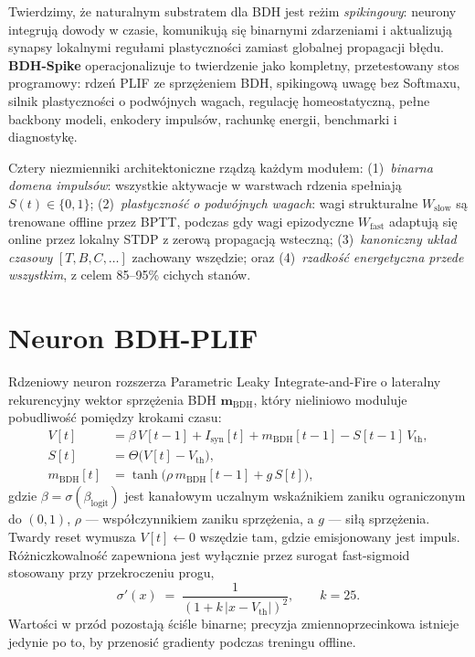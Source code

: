 \documentclass[11pt]{article}
\newcommand{\Wslow}{W_{\text{slow}}}
\newcommand{\Wfast}{W_{\text{fast}}}
\begin{document}
Twierdzimy, że naturalnym substratem dla BDH jest reżim \emph{spikingowy}:
neurony integrują dowody w czasie, komunikują się binarnymi zdarzeniami i
aktualizują synapsy lokalnymi regułami plastyczności zamiast globalnej
propagacji błędu. \textbf{BDH-Spike} operacjonalizuje to twierdzenie jako
kompletny, przetestowany stos programowy: rdzeń PLIF ze sprzężeniem BDH,
spikingową uwagę bez Softmaxu, silnik plastyczności o podwójnych wagach,
regulację homeostatyczną, pełne backbony modeli, enkodery impulsów,
rachunkę energii, benchmarki i diagnostykę.

Cztery niezmienniki architektoniczne rządzą każdym modułem: (1)~\emph{binarna
domena impulsów}: wszystkie aktywacje w warstwach rdzenia spełniają
$S(t)\in\{0,1\}$; (2)~\emph{plastyczność o podwójnych wagach}: wagi
strukturalne $\Wslow$ są trenowane offline przez BPTT, podczas gdy wagi
epizodyczne $\Wfast$ adaptują się online przez lokalny STDP z zerową
propagacją wsteczną; (3)~\emph{kanoniczny układ czasowy}
$[T,B,C,\dots]$ zachowany wszędzie; oraz (4)~\emph{rzadkość energetyczna
przede wszystkim}, z celem 85--95\% cichych stanów.

\section{Neuron BDH-PLIF}
Rdzeniowy neuron rozszerza Parametric Leaky Integrate-and-Fire o lateralny
rekurencyjny wektor sprzężenia BDH $\mathbf{m}_{\text{BDH}}$, który
nieliniowo moduluje pobudliwość pomiędzy krokami czasu:
\begin{align}
V[t] &= \beta\, V[t-1] + I_{\text{syn}}[t] + m_{\text{BDH}}[t-1]
        - S[t-1]\,V_{\text{th}}, \label{eq:mem}\\
S[t] &= \Theta\!\big(V[t] - V_{\text{th}}\big), \label{eq:spike}\\
m_{\text{BDH}}[t] &= \tanh\!\big(\rho\, m_{\text{BDH}}[t-1]
        + g\, S[t]\big), \label{eq:mbdh}
\end{align}
gdzie $\beta=\sigma(\beta_{\text{logit}})$ jest kanałowym uczalnym
wskaźnikiem zaniku ograniczonym do $(0,1)$, $\rho$ --- współczynnikiem
zaniku sprzężenia, a $g$ --- siłą sprzężenia. Twardy reset wymusza
$V[t]\leftarrow 0$ wszędzie tam, gdzie emisjonowany jest impuls.
Różniczkowalność zapewniona jest wyłącznie przez surogat fast-sigmoid
stosowany przy przekroczeniu progu,
\begin{equation}
\sigma'(x) \;=\; \frac{1}{\left(1 + k\,|x - V_{\text{th}}|\right)^2},
\qquad k = 25 .
\label{eq:surrogate}
\end{equation}
Wartości w przód pozostają ściśle binarne; precyzja zmiennoprzecinkowa
istnieje jedynie po to, by przenosić gradienty podczas treningu offline.
\end{document}
